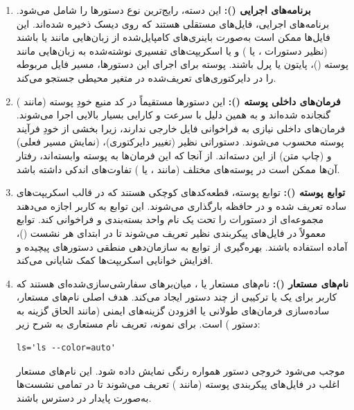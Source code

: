 \begin{enumerate}
  \item \textbf{برنامه‌های اجرایی ():} این دسته، رایج‌ترین نوع دستورها را شامل می‌شود. برنامه‌های اجرایی، فایل‌های مستقلی هستند که روی دیسک ذخیره شده‌اند. این فایل‌ها ممکن است به‌صورت باینری‌های کامپایل‌شده از زبان‌هایی مانند  یا  باشند (نظیر دستورات ،  یا ) و یا اسکریپت‌های تفسیری نوشته‌شده به زبان‌هایی مانند پوسته ()، پایتون یا پرل باشند. پوسته برای اجرای این دستورها، مسیر فایل مربوطه را در دایرکتوری‌های تعریف‌شده در متغیر محیطی  جستجو می‌کند.

  \item \textbf{فرمان‌های داخلی پوسته ():} این دستورها مستقیماً در کد منبع خودِ پوسته (مانند ) گنجانده شده‌اند و به همین دلیل با سرعت و کارایی بسیار بالایی اجرا می‌شوند. فرمان‌های داخلی نیازی به فراخوانی فایل خارجی ندارند، زیرا بخشی از خودِ فرآیند پوسته محسوب می‌شوند. دستوراتی نظیر  (تغییر دایرکتوری)،  (نمایش مسیر فعلی) و  (چاپ متن) از این دسته‌اند. از آنجا که این فرمان‌ها به پوسته وابسته‌اند، رفتار آن‌ها ممکن است در پوسته‌های مختلف (مانند ،  یا ) تفاوت‌های اندکی داشته باشد.

  \item \textbf{توابع پوسته ():} توابع پوسته، قطعه‌کدهای کوچکی هستند که در قالب اسکریپت‌های ساده تعریف شده و در حافظه بارگذاری می‌شوند. این توابع به کاربر اجازه می‌دهند مجموعه‌ای از دستورات را تحت یک نام واحد بسته‌بندی و فراخوانی کند. توابع معمولاً در فایل‌های پیکربندی نظیر  تعریف می‌شوند تا در ابتدای هر نشست ()، آماده استفاده باشند. بهره‌گیری از توابع به سازمان‌دهی منطقی دستورهای پیچیده و افزایش خوانایی اسکریپت‌ها کمک شایانی می‌کند.

  \item \textbf{نام‌های مستعار ():} نام‌های مستعار یا ، میان‌برهای سفارشی‌سازی‌شده‌ای هستند که کاربر برای یک یا ترکیبی از چند دستور ایجاد می‌کند. هدف اصلی نام‌های مستعار، ساده‌سازی فرمان‌های طولانی یا افزودن گزینه‌های ایمنی (مانند الحاق گزینه  به دستور ) است. برای نمونه، تعریف نام مستعاری به شرح زیر:

\begin{latin}
\begin{lstlisting}
ls='ls --color=auto'
\end{lstlisting}
\end{latin}

موجب می‌شود خروجی دستور  همواره رنگی نمایش داده شود. این نام‌های مستعار اغلب در فایل‌های پیکربندی پوسته (مانند ) تعریف می‌شوند تا در تمامی نشست‌ها به‌صورت پایدار در دسترس باشند.
\end{enumerate}

